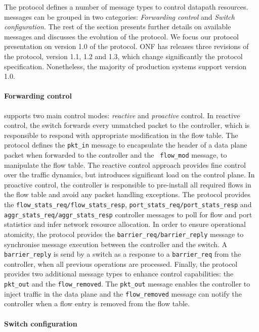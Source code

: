 The protocol defines a number of message types to control datapath resources.
\of messages can be grouped in two categories: \emph{Forwarding control} and
\emph{Switch configuration}. The rest of the section presents further details on
available \of messages and discusses the evolution of the protocol.  We focus
our protocol presentation on version 1.0 of the protocol.  ONF has releases
three revisions of the protocol, version 1.1, 1.2 and 1.3, which change
significantly the protocol specification. Nonetheless, the majority of
production systems support version 1.0.

\paragraph{Forwarding control}

\of supports two main control modes: \emph{reactive} and \emph{proactive}
control. In reactive control, the switch forwards every unmatched packet to the
controller, which is responsible to respond with appropriate modification in the
flow table. The protocol defines the {\tt pkt\_in} message to encapsulate the
header of a data plane packet when forwarded to the controller and the {\tt
  flow\_mod} message, to manipulate the flow table. The reactive control
approach provides fine control over the traffic dynamics, but introduces
significant load on the control plane. In proactive control, the controller is
responsible to pre-install all required flows in the flow table and avoid any
packet handling exceptions. The \of protocol provides the
\texttt{flow\_stats\_req/flow\_stats\_resp},
\texttt{port\_stats\_req/port\_stats\_resp} and
\texttt{aggr\_stats\_req/aggr\_stats\_resp} controller messages to poll for flow
and port statistics and infer network resource allocation. In order to ensure
operational atomicity, the protocol provides the
\texttt{barrier\_req/barrier\_reply} message to synchronise message execution
between the controller and the switch. A {\tt barrier\_reply} is send by a
switch as a response to a {\tt barrier\_req} from the controller, when all
previous operations are processed.  Finally, the \of protocol provides two
additional message types to enhance control capabilities: the {\tt pkt\_out} and
the {\tt flow\_removed}. The {\tt pkt\_out} message enables the controller to
inject traffic in the data plane and the {\tt flow\_removed} message can notify
the controller when a flow entry is removed from the flow table.

\paragraph{Switch configuration} 

